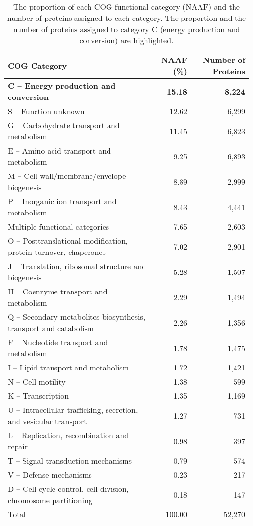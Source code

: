 \documentclass[
  12 pt,
]{article}
\begin{document}
\begin{table}[!h]
\centering
\caption{\label{tab:cog}The proportion of each COG functional category (NAAF) and the number of proteins assigned to each category. The proportion and the number of proteins assigned to category C (energy production and conversion) are highlighted.}
\centering
\fontsize{10}{12}\selectfont
\begin{tabular}[t]{lrr}
\toprule
\textbf{COG Category} & \textbf{NAAF (\%)} & \textbf{Number of Proteins}\\
\midrule
\textbf{C – Energy production and conversion} & \textbf{15.18} & \textbf{8,224}\\
S – Function unknown & 12.62 & 6,299\\
G – Carbohydrate transport and metabolism & 11.45 & 6,823\\
E – Amino acid transport and metabolism & 9.25 & 6,893\\
M – Cell wall/membrane/envelope biogenesis & 8.89 & 2,999\\
P – Inorganic ion transport and metabolism & 8.43 & 4,441\\
Multiple functional categories & 7.65 & 2,603\\
O – Posttranslational modification, protein turnover, chaperones & 7.02 & 2,901\\
J – Translation, ribosomal structure and biogenesis & 5.28 & 1,507\\
H – Coenzyme transport and metabolism & 2.29 & 1,494\\
Q – Secondary metabolites biosynthesis, transport and catabolism & 2.26 & 1,356\\
F – Nucleotide transport and metabolism & 1.78 & 1,475\\
I – Lipid transport and metabolism & 1.72 & 1,421\\
N – Cell motility & 1.38 & 599\\
K – Transcription & 1.35 & 1,169\\
U – Intracellular trafficking, secretion, and vesicular transport & 1.27 & 731\\
L – Replication, recombination and repair & 0.98 & 397\\
T – Signal transduction mechanisms & 0.79 & 574\\
V – Defense mechanisms & 0.23 & 217\\
D – Cell cycle control, cell division, chromosome partitioning & 0.18 & 147\\
\addlinespace
Total & 100.00 & 52,270\\
\bottomrule
\end{tabular}
\end{table}
\newpage
\end{document}

